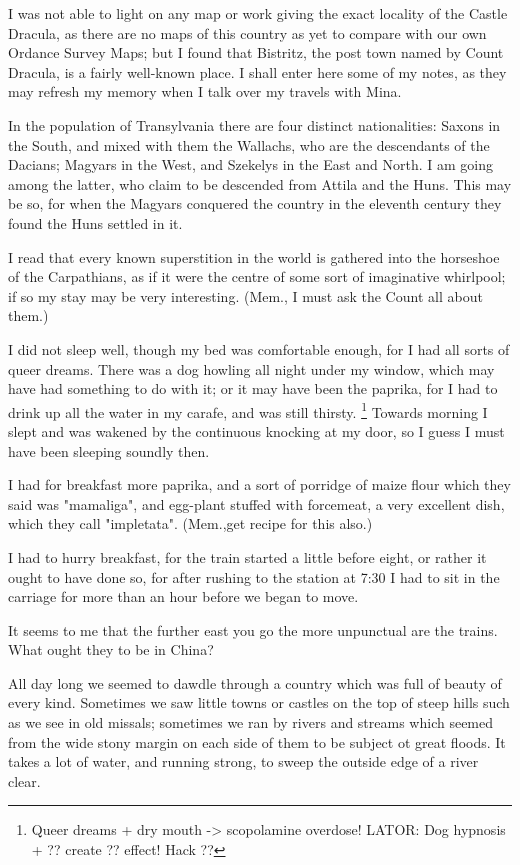 I was not able to light on any map or work giving the exact locality of the Castle Dracula, as there are no maps of this country as yet to compare with our own Ordance Survey Maps; but I found that Bistritz, the post town named by Count Dracula, is a fairly well-known place. I shall enter here some of my notes, as they may refresh my memory when I talk over my travels with Mina. 

In the population of Transylvania there are four distinct nationalities: Saxons in the South, and mixed with them the Wallachs, who are the descendants of the Dacians; Magyars in the West, and Szekelys in the East and North. I am going among the latter, who claim to be descended from Attila and the Huns. This may be so, for when the Magyars conquered the country in the eleventh century they found the Huns settled in it. 

I read that every known superstition in the world is gathered into the horseshoe of the Carpathians, as if it were the centre of some sort of imaginative whirlpool; if so my stay may be very interesting. (Mem., I must ask the Count all about them.) 

I did not sleep well, though my bed was comfortable enough, for I had all sorts of queer dreams. There was a dog howling all night under my window, which may have had something to do with it; or it may have been the paprika, for I had to drink up all the water in my carafe, and was still thirsty.
\footnote{Queer dreams + dry mouth -> scopolamine overdose! \newline LATOR: Dog hypnosis + ?? create ?? effect! Hack ??}
Towards morning I slept and was wakened by the continuous knocking at my door, so I guess I must have been sleeping soundly then. 

I had for breakfast more paprika, and a sort of porridge of maize flour which they said was "mamaliga", and egg-plant stuffed with forcemeat, a very excellent dish, which they call "impletata". (Mem.,get recipe for this also.) 

I had to hurry breakfast, for the train started a little before eight, or rather it ought to have done so, for after rushing to the station at 7:30 I had to sit in the carriage for more than an hour before we began to move. 

It seems to me that the further east you go the more unpunctual are the trains. What ought they to be in China? 

All day long we seemed to dawdle through a country which was full of beauty of every kind. Sometimes we saw little towns or castles on the top of steep hills such as we see in old missals; sometimes we ran by rivers and streams which seemed from the wide stony margin on each side of them to be subject ot great floods. It takes a lot of water, and running strong, to sweep the outside edge of a river clear. 

